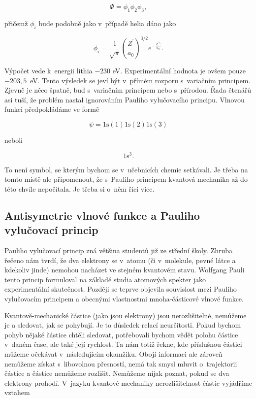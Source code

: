 \begin{equation}
\Phi = \phi_1 \phi_2 \phi_3,
\label{rov:VE-22}
\end{equation}

\noindent přičemž $\phi_i$ bude podobně jako v~případě helia dáno jako

\begin{equation}
\phi_i = \frac{1}{\sqrt{\pi}} \left(\frac{Z^{\prime}}{a_0} \right)^{3/2} e^{-\frac{Z^{\prime r_i}}{a_0}}.
\label{rov:VE-23}
\end{equation}

Výpočet vede k~energii lithia $-$230 eV. Experimentální hodnota je ovšem pouze $-203{,}5$~eV. Tento výsledek se jeví být v~přímém rozporu s~variačním principem. Zjevně je něco špatně, buď s~variačním principem nebo s~přírodou. Řada čtenářů asi tuší, že problém nastal ignorováním Pauliho vylučovacího  principu. Vlnovou funkci předpokládáme ve formě

\begin{equation}
\psi = 1\mathrm{s}(1) 1\mathrm{s}(2) 1\mathrm{s}(3)
\label{rov:VE-24}
\end{equation}

\noindent neboli

\begin{equation}
1\mathrm{s}^3. \nonumber
\end{equation}

\noindent To není symbol, se kterým bychom se v~učebnicích chemie setkávali. Je třeba na tomto místě ale připomenout, že s~Pauliho principem kvantová mechanika až do této chvíle nepočítala. Je třeba si o~něm říci více.

\subsection{Antisymetrie vlnové funkce a Pauliho vylučovací princip}

Pauliho vylučovací princip zná většina studentů již ze střední školy. Zhruba řečeno nám tvrdí, že dva elektrony se v~atomu (či v~molekule, pevné látce a kdekoliv jinde) nemohou nacházet ve stejném kvantovém stavu. Wolfgang Pauli tento princip formuloval na základě studia atomových spekter jako experimentální skutečnost. Později se teprve objevila souvislost mezi Pauliho vylučovacím principem a obecnými vlastnostmi mnoha-částicové vlnové funkce.    

Kvantově-mechanické částice (jako jsou elektrony) jsou nerozlišitelné, nemůžeme je  a sledovat, jak se pohybují. Je to důsledek relací neurčitosti. Pokud bychom pohyb nějaké částice chtěli sledovat, potřebovali bychom vědět polohu částice v~daném čase, ale také její rychlost. Ta nám totiž řekne, kde příslušnou částici můžeme očekávat v~následujícím okamžiku. Obojí informaci ale zároveň nemůžeme získat s~libovolnou přesností, nemá tak smysl mluvit o~trajektorii částice a částice nemůžeme rozlišit. Nemůžeme nijak poznat, pokud se dva elektrony prohodí. V~jazyku kvantové mechaniky nerozlišitelnost částic vyjádříme vztahem

